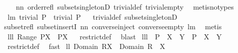 \begin{isabellebody}
\isadelimproof
\ %
\endisadelimproof
%
\isatagproof
{}\isamarkupfalse%
\ \isanewline
nn{}{}\ order{\isacharunderscore}refl\ subset{\isacharunderscore}singletonD\ trivial{\isacharunderscore}def\ trivial{\isacharunderscore}empty\ \isamarkupfalse%
\ {\isacharparenleft}metis{\isacharparenleft}no{\isacharunderscore}types{\isacharparenright}{\isacharparenright}%
\endisatagproof
{\isafoldproof}%
%
\isadelimproof
%
\endisadelimproof
\isanewline
\isanewline
{}\isamarkupfalse%
\ lm{}{}{}{\isacharcolon}\ {\isachardoublequoteopen}trivial\ P\ {\isacharequal}\ trivial\ {\isacharparenleft}P{\isacharcircum}{\isacharminus}{}{\isacharparenright}{\isachardoublequoteclose}%
\isadelimproof
\ %
\endisadelimproof
%
\isatagproof
{}\isamarkupfalse%
\ trivial{\isacharunderscore}def\ subset{\isacharunderscore}singletonD\ \isanewline
subset{\isacharunderscore}refl\ subset{\isacharunderscore}insertI\ nn{}{}\ converse{\isacharunderscore}inject\ converse{\isacharunderscore}empty\ lm{}{}{}\ \isamarkupfalse%
\ metis%
\endisatagproof
{\isafoldproof}%
%
\isadelimproof
%
\endisadelimproof
\isanewline
\isanewline
{}\isamarkupfalse%
\ lll{}{}{\isacharcolon}\ {\isachardoublequoteopen}Range\ {\isacharparenleft}P{\isacharbar}{\isacharbar}X{\isacharparenright}\ {\isacharequal}\ P{\isacharbackquote}{\isacharbackquote}X{\isachardoublequoteclose}%
\isadelimproof
\ %
\endisadelimproof
%
\isatagproof
{}\isamarkupfalse%
\ restrict{\isacharunderscore}def\ \isamarkupfalse%
\ blast%
\endisatagproof
{\isafoldproof}%
%
\isadelimproof
%
\endisadelimproof
\isanewline
{}\isamarkupfalse%
\ lll{}{}{\isacharcolon}\ \ {\isachardoublequoteopen}{\isacharparenleft}P\ {\isacharbar}{\isacharbar}\ X{\isacharparenright}\ {\isacharbar}{\isacharbar}\ Y\ {\isacharequal}\ P\ {\isacharbar}{\isacharbar}\ {\isacharparenleft}X\ {\isasyminter}\ Y{\isacharparenright}{\isachardoublequoteclose}\ \isanewline
%
\isadelimproof
\isanewline
%
\endisadelimproof
%
\isatagproof
{}\isamarkupfalse%
\ restrict{\isacharunderscore}def\ \isamarkupfalse%
\ fast%
\endisatagproof
{\isafoldproof}%
%
\isadelimproof
\isanewline
%
\endisadelimproof
{}\isamarkupfalse%
\ ll{}{}{\isacharcolon}\ {\isachardoublequoteopen}Domain\ {\isacharparenleft}R{\isacharbar}{\isacharbar}X{\isacharparenright}\ {\isacharequal}\ Domain\ R\ {\isasyminter}\ X{\isachardoublequoteclose}%

\end{isabellebody}
